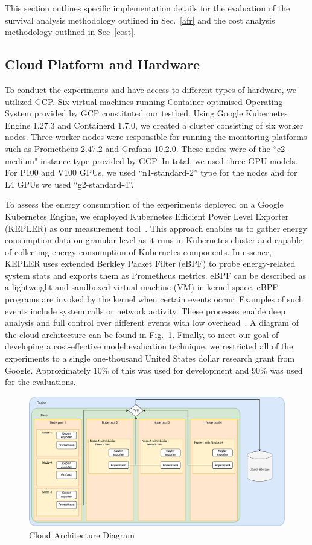 \documentclass[journal]{IEEEtran}
\begin{document}
This section outlines specific implementation details for the evaluation of the survival analysis methodology outlined in Sec.~\ref{afr} and the cost analysis methodology outlined in Sec~\ref{cost}.


\subsection{Cloud Platform and Hardware}
To conduct the experiments and have access to different types of hardware, we utilized GCP. Six virtual machines running Container optimised Operating System provided by GCP constituted our testbed. Using Google Kubernetes Engine 1.27.3 and Containerd 1.7.0,  we created a cluster consisting of six worker nodes. Three worker nodes were responsible for running the monitoring platforms such as Prometheus 2.47.2 and Grafana 10.2.0. These nodes were of the ``e2-medium" instance type provided by GCP. In total, we used three GPU models. For P100 and V100 GPUs, we used ``n1-standard-2'' type for the nodes and for L4 GPUs we used ``g2-standard-4''.

To assess the energy consumption of the experiments deployed on a Google Kubernetes Engine, we employed Kubernetes Efficient Power Level Exporter (KEPLER) as our measurement tool~\cite{amaral2023kepler}. This approach enables us to gather energy consumption data on granular level as it runs in Kubernetes cluster and capable of collecting energy consumption of Kubernetes components. In essence, KEPLER uses extended Berkley Packet Filter (eBPF) to probe energy-related system stats and exports them as Prometheus metrics. eBPF can be described as a lightweight and sandboxed virtual machine (VM) in kernel space. eBPF programs are invoked by the kernel when certain events occur. Examples of such events include system calls or network activity. These processes enable deep analysis and full control over different events with low overhead~\cite{sedghpour@ebpf}. A diagram of the cloud architecture can be found in Fig.~\ref{fig:architecture}. Finally, to meet our goal of developing a cost-effective model evaluation technique, we restricted all of the experiments to a single one-thousand United States dollar research grant from Google. Approximately 10\% of this was used for development and 90\% was used for the evaluations.

\begin{figure}
    \centering
    \includegraphics[width=.8\textwidth]{plots/architecture.pdf}
    \caption{Cloud Architecture Diagram}
    \label{fig:architecture}
\end{figure}
\end{document}
